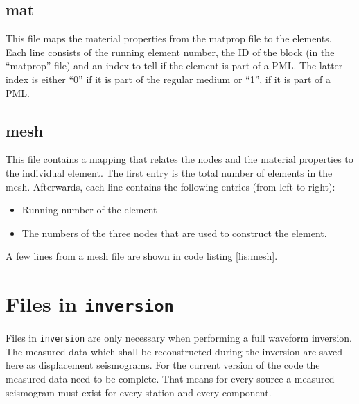     	\subsection{mat}
    	\label{subsec:mat}
    		
    		This file maps the material properties from the matprop file to the elements. Each line consists of the running element number, the ID of the block (in the ``matprop'' file) and an index to tell if the element is part of a PML. The latter index is either ``0'' if it is part of the regular medium or ``1'', if it is part of a PML. 
    	\subsection{mesh}
    	\label{subsec:mesh}
    		
    		This file contains a mapping that relates the nodes and the material properties to the individual element. The first entry is the total number of elements in the mesh. Afterwards, each line contains the following entries (from left to right):
    		\begin{itemize}
    			\item Running number of the element
    			\item The numbers of the three nodes that are used to construct the element.
	   		\end{itemize}
	   		A few lines from a mesh file are shown in code listing \ref{lis:mesh}.
    \section{Files in \texttt{inversion}}
    \label{sec:ininvfiles}
    	Files in \texttt{inversion} are only necessary when performing a full waveform inversion. The measured data which shall be reconstructed during the inversion are saved here as displacement seismograms. For the current version of the code the measured data need to be complete. That means for every source a measured seismogram must exist for every station and every component.
    	

